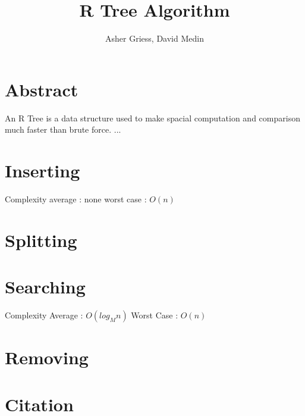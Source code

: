 \documentclass{article}
\author{Asher Griess, David Medin}
\title{R Tree Algorithm}
\begin{document}
\maketitle

\section{Abstract}
An R Tree is a data structure used to make spacial computation and comparison much faster than brute force.  ...

\section{Inserting}
Complexity
average : none
worst case : $O(n)$
\section{Splitting}

\section{Searching}
Complexity
Average : $O(log_Mn)$
Worst Case : $O(n)$

\section{Removing}

\section{Citation}


\end{document}
